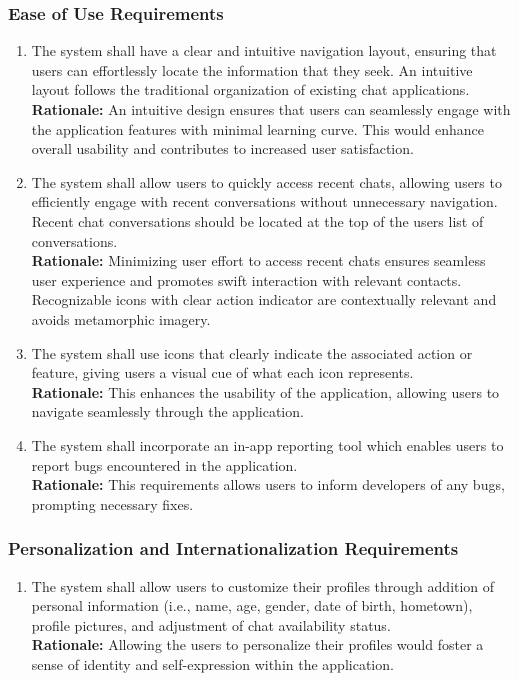 \documentclass[]{article}
\begin{document}
\subsubsection{Ease of Use Requirements}
\label{ssub:ease_of_use_requirements}
\begin{enumerate}[{UH-EOU}1. ]
	\item The system shall have a clear and intuitive navigation layout, ensuring that users can effortlessly locate
	      the information that they seek. An intuitive layout follows the traditional organization of existing chat applications. \\
	      {\bf Rationale:} An intuitive design ensures that users can seamlessly engage with the application features with minimal learning curve.
	      This would enhance overall usability and contributes to increased user satisfaction.
	\item The system shall allow users to quickly access recent chats, allowing users to efficiently engage with recent
	      conversations without unnecessary navigation. Recent chat conversations should be located at the top of the users list of conversations.\\
	      {\bf Rationale:} Minimizing user effort to access recent chats ensures seamless user experience and promotes swift interaction
	      with relevant contacts. Recognizable icons with clear action indicator are contextually relevant and avoids metamorphic imagery.
	\item The system shall use icons that clearly indicate the associated action or feature, giving users a visual cue of what each icon represents. \\
	      {\bf Rationale:} This enhances the usability of the application, allowing users to navigate seamlessly through the application.
	\item The system shall incorporate an in-app reporting tool which enables users to report bugs encountered in the application.\\
	      {\bf Rationale:} This requirements allows users to inform developers of any bugs, prompting necessary fixes.
\end{enumerate}
\subsubsection{Personalization and Internationalization Requirements}
\label{ssub:personalization_and_internationalization_requirements}
\begin{enumerate}[{UH-PI}1. ]
	\item The system shall allow users to customize their profiles through addition of personal information (i.e., name, age, gender, date of birth, hometown), profile pictures, and adjustment of chat availability status. \\
	      {\bf Rationale:} Allowing the users to personalize their profiles would foster a sense of identity and self-expression within the application.
\end{enumerate}
\end{document}
